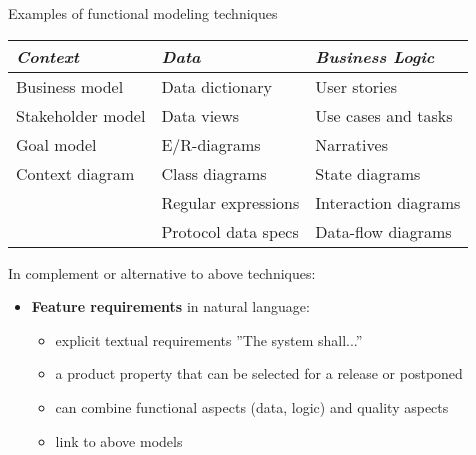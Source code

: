 \begin{Slide}{Examples of functional modeling techniques}
\begin{tabular}{l l  l}
\textbf{\emph{Context}} & \textbf{\emph{Data}}  & \textbf{\emph{Business Logic}}  \\ \hline
 Business model     &  Data dictionary     & User stories\\
 Stakeholder model  &  Data views          & Use cases and tasks \\
 Goal model         &  E/R-diagrams        & Narratives \\
 Context diagram    &  Class diagrams      & State diagrams \\
                    &  Regular expressions & Interaction diagrams\\
                    &  Protocol data specs & Data-flow diagrams \\
\end{tabular}

\vspace{1em}

In complement or alternative to above techniques:
\begin{itemize}
\item \textbf{Feature requirements} in natural language:
\begin{itemize}
\item explicit textual requirements ''The system shall...''
\item a product property that can be selected for a release or postponed
\item can combine functional aspects (data, logic) and quality aspects
\item link to above models


\end{itemize}
\end{itemize}
\end{Slide}